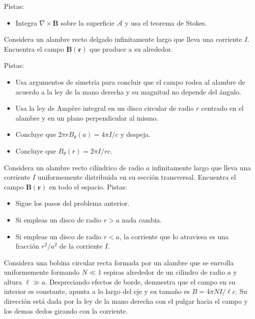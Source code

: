 \documentclass{exam}
\begin{document}
\begin{questions}
    Pistas:
    \begin{itemize}
    \item Integra $\nabla\times\bm B$ sobre la superficie $\mathcal A$
      y usa el teorema de Stokes.
    \end{itemize}
  \question Considera un alambre recto delgado infinitamente largo que lleva
    una corriente $I$. Encuentra el campo $\bm B(\bm r)$ que produce a su
    alrededor.

    Pistas:
    \begin{itemize}
    \item Usa argumentos de simetría para concluir que el campo rodea
      al alambre de acuerdo a la ley de la mano derecha y su magnitud
      no depende del ángulo.
    \item Usa la ley de Ampère integral en un disco circular de radio
      $r$ centrado en el alambre y en un plano perpendicular al mismo.
    \item Concluye que $2\pi r B_\theta(a)=4\pi I/c$ y despeja.
    \item Concluye que $B_\theta(r)=2\pi I/rc$.
    \end{itemize}
  \question Considera un alambre recto cilíndrico de radio $a$
    infinitamente largo que lleva una corriente $I$ uniformemente
    distribuida en su sección transversal. Encuentra el campo $\bm
    B(\bm r)$ en todo el espacio.
    Pistas:
    \begin{itemize}
    \item Sigue los pasos del problema anterior.
    \item Si empleas un disco de radio $r>a$  nada cambia.
    \item Si empleas un disco de radio $r<a$, la corriente que lo
      atraviesa es una fracción $r^2/a^2$ de la corriente $I$.
    \end{itemize}

  \question Considera una bobina circular recta formada por un alambre
    que se enrrolla uniformemente formando $N\ll1$
    espiras alrededor de un cilindro de radio $a$ y altura $\ell\gg
    a$. Despreciando efectos de borde, demuestra que el campo en su
    interior es constante, apunta a lo largo del eje y su tamaño es
    $B=4\pi N I/\ell c$. Su dirección está dada por la ley de la mano
    derecha con el pulgar hacia el campo y los demas dedos girando con
    la corriente.


\end{questions}
\end{document}
